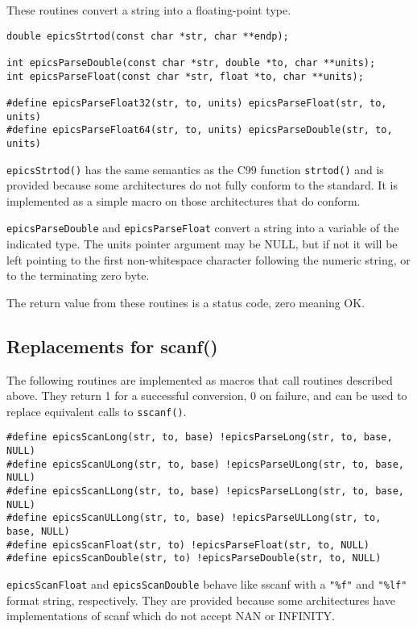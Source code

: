 These routines convert a string into a floating-point type.

\begin{verbatim}
double epicsStrtod(const char *str, char **endp);

int epicsParseDouble(const char *str, double *to, char **units);
int epicsParseFloat(const char *str, float *to, char **units);

#define epicsParseFloat32(str, to, units) epicsParseFloat(str, to, units)
#define epicsParseFloat64(str, to, units) epicsParseDouble(str, to, units)
\end{verbatim}

\verb|epicsStrtod()| has the same semantics as the C99 function \verb|strtod()| and is provided because some architectures do not fully conform to the standard. It is implemented as a simple macro on those architectures that do conform.

\verb|epicsParseDouble| and \verb|epicsParseFloat| convert a string into a variable of the indicated type.
The units pointer argument may be NULL, but if not it will be left pointing to the first non-whitespace character following the numeric string, or to the terminating zero byte.

The return value from these routines is a status code, zero meaning OK.

\subsection{Replacements for scanf()}

The following routines are implemented as macros that call routines described above.
They return 1 for a successful conversion, 0 on failure, and can be used to replace equivalent calls to \verb|sscanf()|.

\begin{verbatim}
#define epicsScanLong(str, to, base) !epicsParseLong(str, to, base, NULL)
#define epicsScanULong(str, to, base) !epicsParseULong(str, to, base, NULL)
#define epicsScanLLong(str, to, base) !epicsParseLLong(str, to, base, NULL)
#define epicsScanULLong(str, to, base) !epicsParseULLong(str, to, base, NULL)
#define epicsScanFloat(str, to) !epicsParseFloat(str, to, NULL)
#define epicsScanDouble(str, to) !epicsParseDouble(str, to, NULL)
\end{verbatim}


\verb|epicsScanFloat| and \verb|epicsScanDouble| behave like sscanf with a \verb|"%f"| and \verb|"%lf"| format string, respectively.
They are provided because some architectures have implementations of scanf which do not accept NAN or INFINITY.

